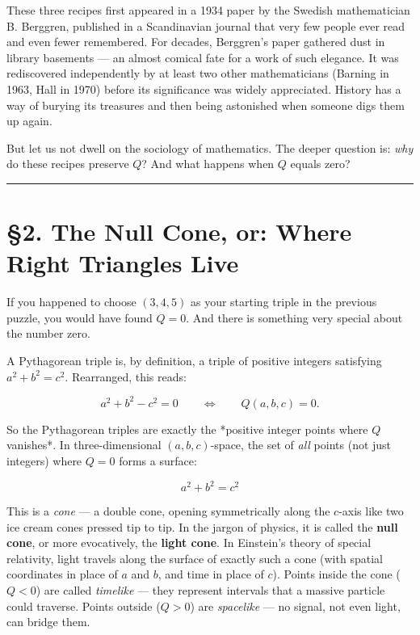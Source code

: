 \documentclass[11pt,openany]{book}
\theoremstyle{definition}
\theoremstyle{plain}
\theoremstyle{remark}
\begin{document}
These three recipes first appeared in a 1934 paper by the Swedish mathematician B. Berggren, published in a Scandinavian journal that very few people ever read and even fewer remembered. For decades, Berggren's paper gathered dust in library basements — an almost comical fate for a work of such elegance. It was rediscovered independently by at least two other mathematicians (Barning in 1963, Hall in 1970) before its significance was widely appreciated. History has a way of burying its treasures and then being astonished when someone digs them up again.

But let us not dwell on the sociology of mathematics. The deeper question is: \textit{why} do these recipes preserve $Q$? And what happens when $Q$ equals zero?

\bigskip\noindent\rule{\textwidth}{0.4pt}\bigskip


\section{§2. The Null Cone, or: Where Right Triangles Live}


If you happened to choose $(3, 4, 5)$ as your starting triple in the previous puzzle, you would have found $Q = 0$. And there is something very special about the number zero.

A Pythagorean triple is, by definition, a triple of positive integers satisfying $a^2 + b^2 = c^2$. Rearranged, this reads:

$$a^2 + b^2 - c^2 = 0 \qquad\Longleftrightarrow\qquad Q(a, b, c) = 0.$$

So the Pythagorean triples are exactly the *positive integer points where $Q$ vanishes*. In three-dimensional $(a, b, c)$-space, the set of \textit{all} points (not just integers) where $Q = 0$ forms a surface:

$$a^2 + b^2 = c^2$$

This is a \textit{cone} — a double cone, opening symmetrically along the $c$-axis like two ice cream cones pressed tip to tip. In the jargon of physics, it is called the \textbf{null cone}, or more evocatively, the \textbf{light cone}. In Einstein's theory of special relativity, light travels along the surface of exactly such a cone (with spatial coordinates in place of $a$ and $b$, and time in place of $c$). Points inside the cone ($Q < 0$) are called \textit{timelike} — they represent intervals that a massive particle could traverse. Points outside ($Q > 0$) are \textit{spacelike} — no signal, not even light, can bridge them.
\end{document}
